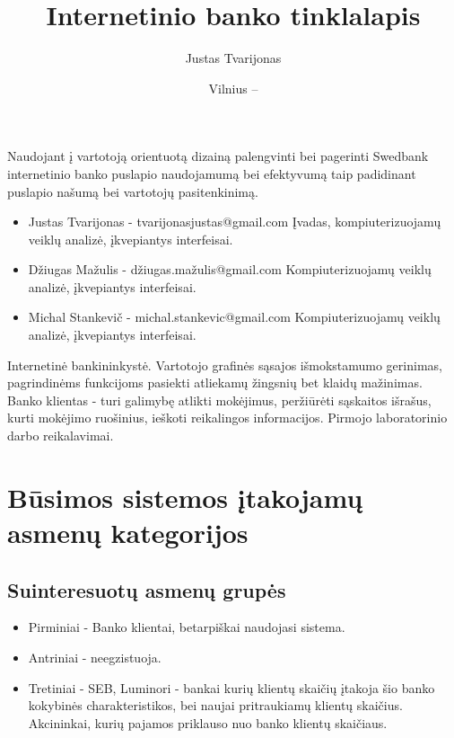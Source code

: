 \documentclass{VUMIFPSkursinis}
\title{Internetinio banko tinklalapis}
\author{Justas Tvarijonas}
\date{Vilnius – \the\year}
\begin{document}
\maketitle
{}
Naudojant į vartotoją orientuotą dizainą palengvinti bei pagerinti Swedbank internetinio banko puslapio naudojamumą bei efektyvumą taip padidinant puslapio našumą bei vartotojų pasitenkinimą.
\begin{itemize}
	\item Justas Tvarijonas - tvarijonasjustas@gmail.com \newline
	Įvadas, kompiuterizuojamų veiklų analizė, įkvepiantys interfeisai.
	\item Džiugas Mažulis - džiugas.mažulis@gmail.com \newline 
	Kompiuterizuojamų veiklų analizė, įkvepiantys interfeisai.
	\item Michal Stankevič - michal.stankevic@gmail.com \newline
	 Kompiuterizuojamų veiklų analizė, įkvepiantys interfeisai.
\end{itemize}
\tableofcontents
{}
Internetinė bankininkystė.
Vartotojo grafinės sąsajos išmokstamumo gerinimas, pagrindinėms funkcijoms pasiekti atliekamų žingsnių bet klaidų mažinimas.
Banko klientas - turi galimybę atlikti mokėjimus, peržiūrėti sąskaitos išrašus, kurti mokėjimo ruošinius, ieškoti reikalingos informacijos.
Pirmojo laboratorinio darbo reikalavimai.
\section{Būsimos sistemos įtakojamų asmenų kategorijos}
\subsection{Suinteresuotų asmenų grupės}
\begin{itemize}
	\item Pirminiai - Banko klientai, betarpiškai naudojasi sistema.
	\item Antriniai - neegzistuoja.
	\item Tretiniai - SEB, Luminori - bankai kurių klientų skaičių įtakoja šio banko kokybinės charakteristikos, bei naujai pritraukiamų klientų skaičius. Akcininkai, kurių pajamos priklauso nuo banko klientų skaičiaus.
\end{itemize}
\end{document}
